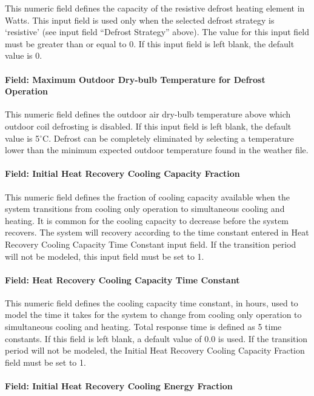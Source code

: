 This numeric field defines the capacity of the resistive defrost heating element in Watts. This input field is used only when the selected defrost strategy is `resistive' (see input field ``Defrost Strategy'' above). The value for this input field must be greater than or equal to 0. If this input field is left blank, the default value is 0.

\paragraph{Field: Maximum Outdoor Dry-bulb Temperature for Defrost Operation}

This numeric field defines the outdoor air dry-bulb temperature above which outdoor coil defrosting is disabled. If this input field is left blank, the default value is 5$^\circ$C. Defrost can be completely eliminated by selecting a temperature lower than the minimum expected outdoor temperature found in the weather file.

\paragraph{Field: Initial Heat Recovery Cooling Capacity Fraction}

This numeric field defines the fraction of cooling capacity available when the system transitions from cooling only operation to simultaneous cooling and heating. It is common for the cooling capacity to decrease before the system recovers. The system will recovery according to the time constant entered in Heat Recovery Cooling Capacity Time Constant input field. If the transition period will not be modeled, this input field must be set to 1.

\paragraph{Field: Heat Recovery Cooling Capacity Time Constant}

This numeric field defines the cooling capacity time constant, in hours, used to model the time it takes for the system to change from cooling only operation to simultaneous cooling and heating. Total response time is defined as 5 time constants. If this field is left blank, a default value of 0.0 is used. If the transition period will not be modeled, the Initial Heat Recovery Cooling Capacity Fraction field must be set to 1.

\paragraph{Field: Initial Heat Recovery Cooling Energy Fraction}

